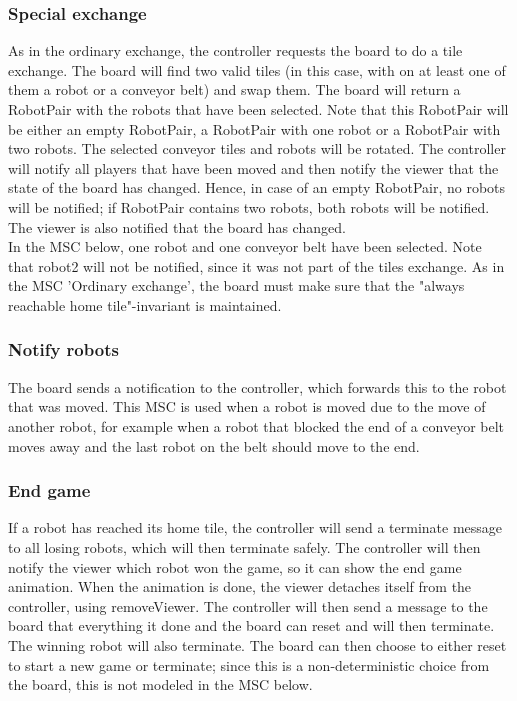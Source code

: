 	\subsubsection{Special exchange}
	\begin{minipage}{\linewidth}
		As in the ordinary exchange, the controller requests the board to do a tile exchange. The board will find two valid tiles (in this case, with on at least one of them a robot or a conveyor belt) and swap them. The board will return a RobotPair with the robots that have been selected. Note that this RobotPair will be either an empty RobotPair, a RobotPair with one robot or a RobotPair with two robots. The selected conveyor tiles and robots will be rotated. The controller will notify all players that have been moved and then notify the viewer that the state of the board has changed. Hence, in case of an empty RobotPair, no robots will be notified; if RobotPair contains two robots, both robots will be notified. The viewer is also notified that the board has changed. \\
In the MSC below, one robot and one conveyor belt have been selected. Note that robot2 will not be notified, since it was not part of the tiles exchange. As in the MSC 'Ordinary exchange', the board must make sure that the "always reachable home tile"-invariant is maintained.

		
	\end{minipage}	

	\subsubsection{Notify robots}
	\begin{minipage}{\linewidth}
		The board sends a notification to the controller, which forwards this to the robot that was moved. This MSC is used when a robot is moved due to the move of another robot, for example when a robot that blocked the end of a conveyor belt moves away and the last robot on the belt should move to the end.

		
	\end{minipage}

	\subsubsection{End game}
	\begin{minipage}{\linewidth}
		If a robot has reached its home tile, the controller will send a terminate message to all losing robots, which will then terminate safely. The controller will then notify the viewer which robot won the game, so it can show the end game animation. When the animation is done, the viewer detaches itself from the controller, using removeViewer. The controller will then send a message to the board that everything it done and the board can reset and will then terminate. The winning robot will also terminate. The board can then choose to either reset to start a new game or terminate; since this is a non-deterministic choice from the board, this is not modeled in the MSC below.

		
	\end{minipage}

